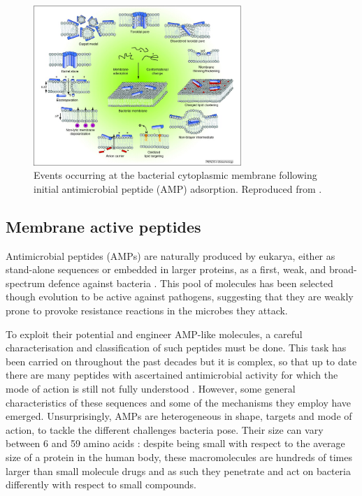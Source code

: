 \begin{figure}
\begin{center}
\includegraphics[width = 0.7\textwidth]{1introduction/pics/amp_mech.jpg}
\caption[Antimicrobial peptides]{Events occurring at the bacterial cytoplasmic membrane following initial antimicrobial peptide (AMP) adsorption. Reproduced from \cite{Nguyen2011}.} \label{fig:amp}
\end{center}
\end{figure}


\subsection{Membrane active peptides} \label{sec:host-defense-peptides}
Antimicrobial peptides (AMPs) are naturally produced by eukarya, either as stand-alone sequences or embedded in larger proteins, as a first, weak, and broad-spectrum defence against bacteria \cite{Nguyen2011}.
%
This pool of molecules has been selected though evolution to be active against pathogens, suggesting that they are weakly prone to provoke resistance reactions in the microbes they attack.

To exploit their potential and engineer AMP-like molecules, a careful characterisation and classification of such peptides must be done. This task has been carried on throughout the past decades but it is complex, so that up to date there are many peptides with ascertained antimicrobial activity for which the mode of action is still not fully understood \cite{Ebbensgaard2015}. However, some general characteristics of these sequences and some of the mechanisms they employ have emerged.
%
Unsurprisingly, AMPs are heterogeneous in shape, targets and mode of action, to tackle the different challenges bacteria pose. Their size can vary between 6 and 59 amino acids \cite{Brogden2005}: despite being small with respect to the average size of a protein in the human body, these macromolecules are hundreds of times larger than small molecule drugs and as such they penetrate and act on bacteria differently with respect to small compounds.

